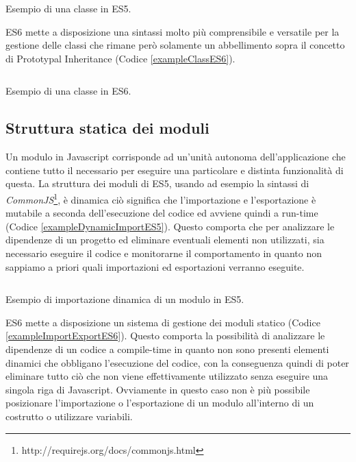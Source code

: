 \begin{listing}[ht]
\inputminted{Javascript}{sources/examplePrototypeInheritanceES5.js}
\caption{Esempio di una classe in ES5.}
\label{examplePrototypeInheritanceES5}
\end{listing}

\noindent
ES6 mette a disposizione una sintassi molto più comprensibile e versatile per la gestione delle classi che rimane però solamente un abbellimento sopra il concetto di Prototypal Inheritance (Codice \ref{exampleClassES6}). 

\begin{listing}[ht]
\inputminted{Javascript}{sources/exampleClassES6.js}
\caption{Esempio di una classe in ES6.}
\label{exampleClassES6}
\end{listing}

\subsection{Struttura statica dei moduli}
\label{strutturaStaticaDeiModuli}
Un modulo in Javascript corrisponde ad un'unità autonoma dell'applicazione che contiene tutto il necessario per eseguire una particolare e distinta funzionalità di questa. La struttura dei moduli di ES5, usando ad esempio la sintassi di \textit{CommonJS}\footnote{http://requirejs.org/docs/commonjs.html}, è dinamica ciò significa che l'importazione e l'esportazione è mutabile a seconda dell'esecuzione del codice ed avviene quindi a run-time (Codice \ref{exampleDynamicImportES5}). Questo comporta che per analizzare le dipendenze di un progetto ed eliminare eventuali elementi non utilizzati, sia necessario eseguire il codice e monitorarne il comportamento in quanto non sappiamo a priori quali importazioni ed esportazioni verranno eseguite.

\begin{listing}[ht]
\inputminted{Javascript}{sources/exampleDynamicImportES5.js}
\caption{Esempio di importazione dinamica di un modulo in ES5.} 
\label{exampleDynamicImportES5}
\end{listing}

\noindent
ES6 mette a disposizione un sistema di gestione dei moduli statico (Codice \ref{exampleImportExportES6}). Questo comporta la possibilità di analizzare le dipendenze di un codice a compile-time in quanto non sono presenti elementi dinamici che obbligano l'esecuzione del codice, con la conseguenza quindi di poter eliminare tutto ciò che non viene effettivamente utilizzato senza eseguire una singola riga di Javascript.
Ovviamente in questo caso non è più possibile posizionare l'importazione o l'esportazione di un modulo all'interno di un costrutto o utilizzare variabili.


